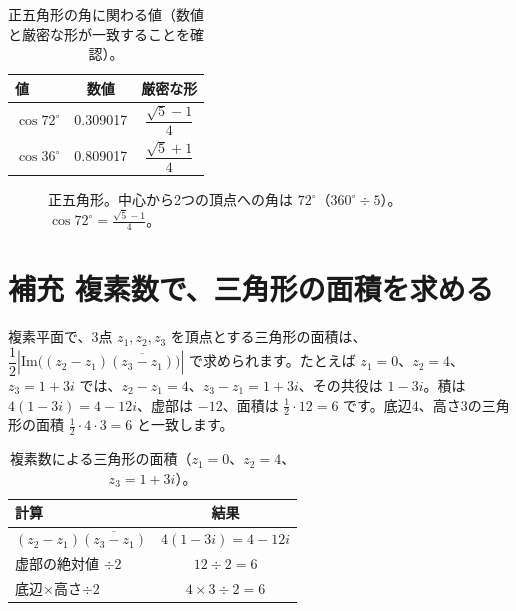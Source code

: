 \documentclass[a4paper,11pt,openany]{ltjsbook}
\begin{document}
\begin{table}[htbp]
\centering
\begin{tabular}{lcc}
\toprule
値 & 数値 & 厳密な形\\
\midrule
$\cos72^\circ$ & 0.309017 & $\dfrac{\sqrt5-1}4$\\
$\cos36^\circ$ & 0.809017 & $\dfrac{\sqrt5+1}4$\\
\bottomrule
\end{tabular}
\caption{正五角形の角に関わる値（数値と厳密な形が一致することを確認）。}
\end{table}

\begin{figure}[htbp]
\centering
{}
\caption{正五角形。中心から2つの頂点への角は $72^\circ$（$360^\circ\div5$）。$\cos72^\circ=\tfrac{\sqrt5-1}4$。}
\end{figure}

\section{補充 複素数で、三角形の面積を求める}

複素平面で、3点 $z_1,z_2,z_3$ を頂点とする三角形の面積は、$\dfrac12\left|\mathrm{Im}\bigl((z_2-z_1)\overline{(z_3-z_1)}\bigr)\right|$ で求められます。たとえば $z_1=0$、$z_2=4$、$z_3=1+3i$ では、$z_2-z_1=4$、$z_3-z_1=1+3i$、その共役は $1-3i$。積は $4(1-3i)=4-12i$、虚部は $-12$、面積は $\tfrac12\cdot12=6$ です。底辺4、高さ3の三角形の面積 $\tfrac12\cdot4\cdot3=6$ と一致します。

\begin{table}[htbp]
\centering
\begin{tabular}{lc}
\toprule
計算 & 結果\\
\midrule
$(z_2-z_1)\overline{(z_3-z_1)}$ & $4(1-3i)=4-12i$\\
虚部の絶対値 $\div2$ & $12\div2=6$\\
底辺$\times$高さ$\div2$ & $4\times3\div2=6$\\
\bottomrule
\end{tabular}
\caption{複素数による三角形の面積（$z_1=0$、$z_2=4$、$z_3=1+3i$）。}
\end{table}
\end{document}
